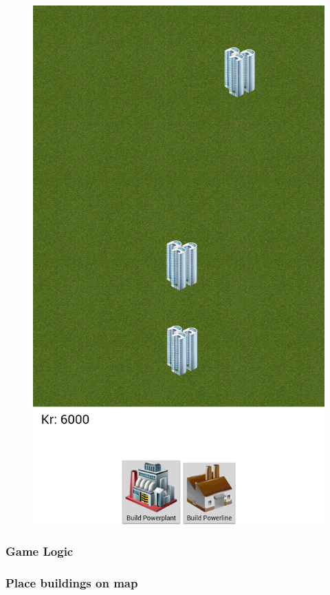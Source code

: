 \begin{figure}[!ht]
{		\includegraphics[scale=0.2]{pictures/game_screenshot_1}
	}
	\end{figure}

\subsubsection*{Game Logic}
	\subsubsection*{Place buildings on map}

